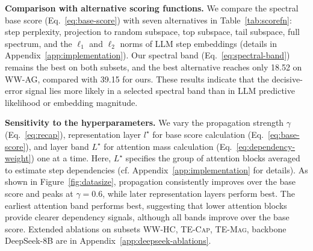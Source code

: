 \begin{table}
\centering
\footnotesize
\setlength{\tabcolsep}{4pt}
\renewcommand{\arraystretch}{1.04}
\vspace{-0.3cm}
\caption{\small \textbf{Comparison with alternative scoring functions.} Results are step-level accuracy (\%) on backbone Qwen3.5-9B, with no rescoring.
}
\vspace{-0.3cm}
\label{tab:scorefn}
\vspace{-1.8\baselineskip}
\end{table}
\textbf{Comparison with alternative scoring functions.} We compare the spectral base score (Eq.~\ref{eq:base-score}) with seven alternatives in Table~\ref{tab:scorefn}: step perplexity, projection to random subspace, top subspace, tail subspace, full spectrum, and the $\ell_1$ and $\ell_2$ norms of LLM step embeddings (details in Appendix~\ref{app:implementation}). Our spectral band (Eq.~\ref{eq:spectral-band}) remains the best on both subsets, and the best alternative reaches only 18.52 on \textsc{WW-AG}, compared with 39.15 for ours. These results indicate that the decisive-error signal lies more likely in a selected spectral band  than in LLM predictive likelihood or embedding magnitude.

\textbf{Sensitivity to the hyperparameters.} We vary the propagation strength $\gamma$ (Eq.~\ref{eq:recap}), representation layer $l^\star$ for base score calculation (Eq.~\ref{eq:base-score}), and layer band $L^\star$ for attention mass calculation (Eq.~\ref{eq:dependency-weight}) one at a time. Here, $L^\star$ specifies the group of attention blocks averaged to estimate step dependencies (cf. Appendix~\ref{app:implementation} for details). As shown in Figure~\ref{fig:datasize}, propagation consistently improves over the base score and peaks at $\gamma=0.6$, while later representation layers perform best. The earliest attention band performs best, suggesting that lower attention blocks provide clearer dependency signals, although all bands improve over the base score.  Extended ablations on subsets \textsc{WW-HC}, \textsc{TE-Cap}, \textsc{TE-Mag}, backbone DeepSeek-8B are in Appendix~\ref{app:deepseek-ablations}.

